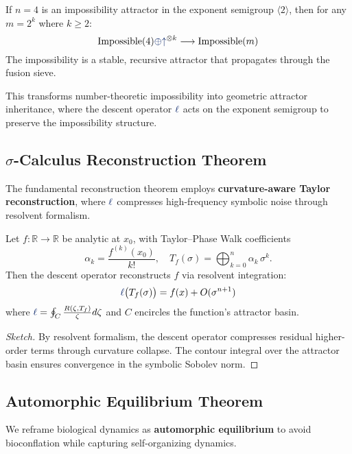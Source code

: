\begin{theorem}
If $n=4$ is an impossibility attractor in the exponent semigroup $\langle 2 \rangle$, then for any $m = 2^k$ where $k \geq 2$:
\[ \text{Impossible}(4) \fuse \grow^{\otimes k} \longrightarrow \text{Impossible}(m) \]
The impossibility is a stable, recursive attractor that propagates through the fusion sieve.
\end{theorem}

This transforms number-theoretic impossibility into geometric attractor inheritance, where the descent operator $\lha$ acts on the exponent semigroup to preserve the impossibility structure.

\subsection{$\sigma$-Calculus Reconstruction Theorem}
The fundamental reconstruction theorem employs \textbf{curvature-aware Taylor reconstruction}, where $\lha$ compresses high-frequency symbolic noise through resolvent formalism.

\begin{theorem}
Let $f\colon \mathbb{R}\to\mathbb{R}$ be analytic at $x_0$, with Taylor--Phase Walk coefficients
\[
  \alpha_k = \frac{f^{(k)}(x_0)}{k!}, \quad T_f(\sigma) = \bigoplus_{k=0}^n \alpha_k\,\sigma^k.
\]
Then the descent operator reconstructs $f$ via resolvent integration:
\[
  \lha\bigl(T_f(\sigma)\bigr) = f(x) + O(\sigma^{n+1})
\]
where $\lha = \oint_C \frac{R(\zeta, T_f)}{\zeta} d\zeta$ and $C$ encircles the function's attractor basin.
\end{theorem}

\begin{proof}[Sketch]
By resolvent formalism, the descent operator compresses residual higher-order terms through curvature collapse. The contour integral over the attractor basin ensures convergence in the symbolic Sobolev norm.
\end{proof}

\subsection{Automorphic Equilibrium Theorem}
We reframe biological dynamics as \textbf{automorphic equilibrium} to avoid bioconflation while capturing self-organizing dynamics.

